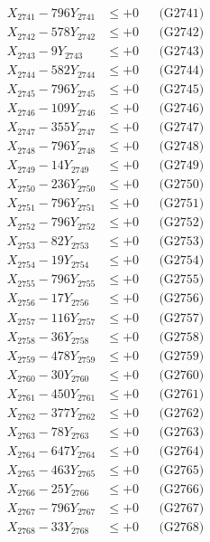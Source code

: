 \documentclass[a4paper,10pt]{article}
\begin{document}
{\begin{align}
\allowbreak
X_{2741} - 796Y_{2741} &\leq +0 && \text{(G2741)} \\
X_{2742} - 578Y_{2742} &\leq +0 && \text{(G2742)} \\
X_{2743} - 9Y_{2743} &\leq +0 && \text{(G2743)} \\
X_{2744} - 582Y_{2744} &\leq +0 && \text{(G2744)} \\
X_{2745} - 796Y_{2745} &\leq +0 && \text{(G2745)} \\
X_{2746} - 109Y_{2746} &\leq +0 && \text{(G2746)} \\
X_{2747} - 355Y_{2747} &\leq +0 && \text{(G2747)} \\
X_{2748} - 796Y_{2748} &\leq +0 && \text{(G2748)} \\
X_{2749} - 14Y_{2749} &\leq +0 && \text{(G2749)} \\
X_{2750} - 236Y_{2750} &\leq +0 && \text{(G2750)} \\
\allowbreak
X_{2751} - 796Y_{2751} &\leq +0 && \text{(G2751)} \\
X_{2752} - 796Y_{2752} &\leq +0 && \text{(G2752)} \\
X_{2753} - 82Y_{2753} &\leq +0 && \text{(G2753)} \\
X_{2754} - 19Y_{2754} &\leq +0 && \text{(G2754)} \\
X_{2755} - 796Y_{2755} &\leq +0 && \text{(G2755)} \\
X_{2756} - 17Y_{2756} &\leq +0 && \text{(G2756)} \\
X_{2757} - 116Y_{2757} &\leq +0 && \text{(G2757)} \\
X_{2758} - 36Y_{2758} &\leq +0 && \text{(G2758)} \\
X_{2759} - 478Y_{2759} &\leq +0 && \text{(G2759)} \\
X_{2760} - 30Y_{2760} &\leq +0 && \text{(G2760)} \\
\allowbreak
X_{2761} - 450Y_{2761} &\leq +0 && \text{(G2761)} \\
X_{2762} - 377Y_{2762} &\leq +0 && \text{(G2762)} \\
X_{2763} - 78Y_{2763} &\leq +0 && \text{(G2763)} \\
X_{2764} - 647Y_{2764} &\leq +0 && \text{(G2764)} \\
X_{2765} - 463Y_{2765} &\leq +0 && \text{(G2765)} \\
X_{2766} - 25Y_{2766} &\leq +0 && \text{(G2766)} \\
X_{2767} - 796Y_{2767} &\leq +0 && \text{(G2767)} \\
X_{2768} - 33Y_{2768} &\leq +0 && \text{(G2768)} \\

\end{align}}
\end{document}
